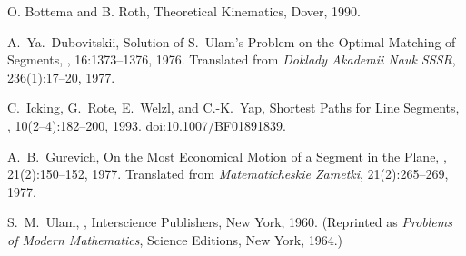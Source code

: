 \documentclass[a4paper,12pt,reqno]{amsart}
\begin{document}
\bigskip
\begin{thebibliography}{}

 O. Bottema and B. Roth,
Theoretical Kinematics,
Dover, 1990.

A.~Ya.~Dubovitskii,
\newblock Solution of S.~Ulam's Problem on the Optimal Matching of Segments,
,
16:1373--1376, 1976.
Translated from
{\em Doklady Akademii Nauk SSSR},
236(1):17--20, 1977.

C.~Icking, G.~Rote, E.~Welzl, and C.-K.~Yap,
\newblock Shortest Paths for Line Segments,
, 10(2--4):182--200, 1993.
\newblock doi:10.1007/BF01891839.

A.~B.~Gurevich,
\newblock On the Most Economical Motion of a Segment in the Plane,
,
21(2):150--152, 1977.
Translated from
{\em Matematicheskie Zametki},
21(2):265--269, 1977.

S.~M.~Ulam,
,
\newblock Interscience Publishers, New York, 1960.
(Reprinted as {\em Problems of Modern Mathematics},
Science Editions, New York, 1964.)

\end{thebibliography}
\end{document}
